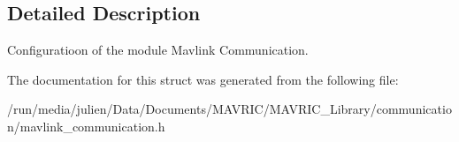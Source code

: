 \subsection{Detailed Description}
Configuratioon of the module Mavlink Communication. 

The documentation for this struct was generated from the following file\+:\begin{DoxyCompactItemize}
\item 
/run/media/julien/\+Data/\+Documents/\+M\+A\+V\+R\+I\+C/\+M\+A\+V\+R\+I\+C\+\_\+\+Library/communication/mavlink\+\_\+communication.\+h\end{DoxyCompactItemize}
